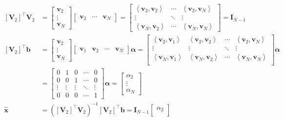 \documentclass[]{article}
\newcommand{\unit}[1]{\bm{\hat{#1}}}
\newcommand{\iprod}[2]{\left\langle #1, #2 \right\rangle}
\newcommand{\tpose}[1]{\left[#1\right]^{\! \top} \!\!}
\begin{document}
\begin{align}
	\tpose{\bm{V}_2} \bm{V}_2 &= \begin{bmatrix}
	\bm{v}_2 \\
	\vdots \\
	\bm{v}_N
	\end{bmatrix}
	\begin{bmatrix}
	\bm{v}_2 & \cdots & \bm{v}_N
	\end{bmatrix} = 
	\begin{bmatrix}
	\iprod{\bm{v}_2}{\bm{v}_2} & \cdots & \iprod{\bm{v}_2}{\bm{v}_N} \\
	\vdots & \ddots & \vdots \\
	\iprod{\bm{v}_N}{\bm{v}_2} & \cdots & \iprod{\bm{v}_N}{\bm{v}_N}
	\end{bmatrix} = \bm{I}_{N - 1} \\
	\tpose{\bm{V}_2} \bm{b} &= \begin{bmatrix}
	\bm{v}_2 \\
	\vdots \\
	\bm{v}_N
	\end{bmatrix}
	\begin{bmatrix}
	\bm{v}_1 & \bm{v}_2 & \cdots & \bm{v}_N
	\end{bmatrix}
	\bm{\alpha} = 
	\begin{bmatrix}
	\iprod{\bm{v}_2}{\bm{v}_1} & \iprod{\bm{v}_2}{\bm{v}_2} & \cdots & \iprod{\bm{v}_2}{\bm{v}_N} \\
	\vdots & \vdots & \ddots & \vdots \\
	\iprod{\bm{v}_N}{\bm{v}_1} & \iprod{\bm{v}_N}{\bm{v}_2} & \cdots & \iprod{\bm{v}_N}{\bm{v}_N} \\
	\end{bmatrix} \bm{\alpha} \\
	&= \begin{bmatrix}
	0 & 1 & 0 & \cdots & 0 \\
	0 & 0 & 1 & \cdots & 0 \\
	\vdots & \vdots & \vdots & \ddots & \vdots \\
	0 & 0 & 0 & \cdots & 1
	\end{bmatrix} \bm{\alpha} = \begin{bmatrix}
	\alpha_2 \\
	\vdots \\
	\alpha_N
	\end{bmatrix} \\
	\unit{x} &= (\tpose{\bm{V}_2} \bm{V}_2)^{-1} \tpose{\bm{V}_2} \bm{b} = \bm{I}_{N - 1} \begin{bmatrix}
	\alpha_2 \\

\end{bmatrix}
\end{align}
\end{document}
